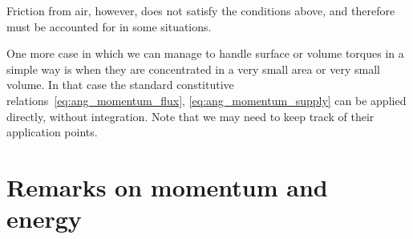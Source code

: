 \documentclass[a4paper,12pt,%
onecolumn,oneside,%
british%
]{memoir}
\renewcommand*{\bm}[1]{\textpdfrender{TextRenderingMode=2,LineWidth=0.2pt}{\boldsymbol{#1}}}
\newcommand{\mynotew}[1]{{\footnotesize\color{midgrey}\faIcon{tools}\ #1}}
\renewcommand*{\|}[1][]{\nonscript\:#1\vert\nonscript\:\mathopen{}}
\newcommand*{\T}{^\transp}%
\newcommand*{\yr}{\bm{r}}
\newcommand*{\yP}{\bm{P}}
\newcommand*{\yL}{\bm{L}}%
\begin{document}
Friction from air, however, does not satisfy the conditions above, and therefore must be accounted for in some situations.

\medskip

One more case in which we can manage to handle surface or volume torques in a simple way is when they are concentrated in a very small area or very small volume. In that case the standard constitutive relations~\eqref{eq:ang_momentum_flux}, \eqref{eq:ang_momentum_supply} can be applied directly, without integration. Note that we may need to keep track of their application points.








% 
% 
% 
% 
% 
% 
% 




\printpagenotes*
\cleartooddpage
\chapter{Remarks on momentum and energy}
\label{cha:energymomentum}
\end{document}
